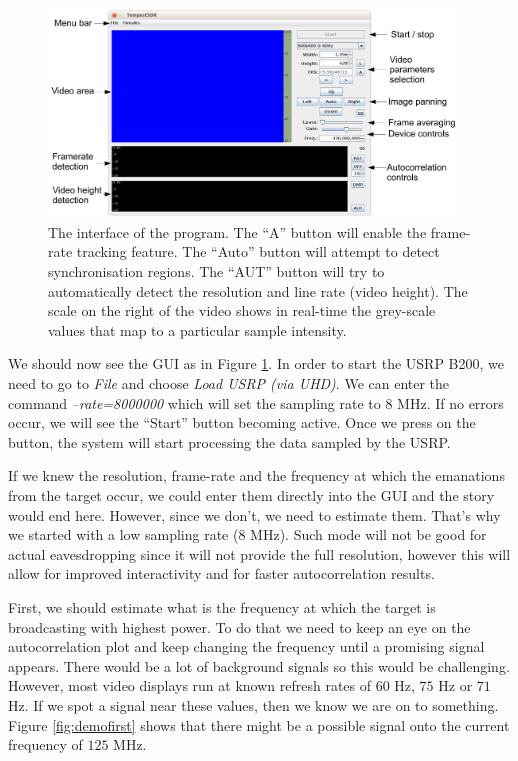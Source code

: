 \documentclass[a4paper,12pt,twoside,openright]{report}
\begin{document}
\begin{figure}[h]
\centering
  \includegraphics[width=0.96\textwidth]{demo_interface}
  \caption{The interface of the program. The ``A'' button will enable the frame-rate tracking feature. The ``Auto'' button will attempt to detect synchronisation regions. The ``AUT'' button will try to automatically detect the resolution and line rate (video height). The scale on the right of the video shows in real-time the grey-scale values that map to a particular sample intensity.}
  \label{fig:demoiface}
\end{figure}

We should now see the GUI as in Figure \ref{fig:demoiface}. In order to start the USRP B200, we need to go to \textit{File} and choose \textit{Load USRP (via UHD)}. We can enter the command \textit{--rate=8000000 } which will set the sampling rate to $8$ MHz. If no errors occur, we will see the ``Start'' button becoming active. Once we press on the button, the system will start processing the data sampled by the USRP.

If we knew the resolution, frame-rate and the frequency at which the emanations from the target occur, we could enter them directly into the GUI and the story would end here. However, since we don't, we need to estimate them. That's why we started with a low sampling rate ($8$ MHz). Such mode will not be good for actual eavesdropping since it will not provide the full resolution, however this will allow for improved interactivity and for faster autocorrelation results.

First, we should estimate what is the frequency at which the target is broadcasting with highest power. To do that we need to keep an eye on the autocorrelation plot and keep changing the frequency until a promising signal appears. There would be a lot of background signals so this would be challenging. However, most video displays run at known refresh rates of $60$ Hz, $75$ Hz or $71$ Hz. If we spot a signal near these values, then we know we are on to something. Figure \ref{fig:demofirst} shows that there might be a possible signal onto the current frequency of $125$ MHz.
\end{document}
